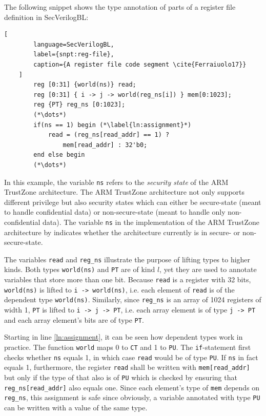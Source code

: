 \begin{example}
    The following snippet shows the type annotation of parts of a register file definition in SecVerilogBL:
    \begin{lstlisting}[
        language=SecVerilogBL,
        label={snpt:reg-file},
        caption={A register file code segment \cite{Ferraiuolo17}}
    ]
        reg [0:31] {world(ns)} read;
        reg [0:31] { i -> j -> world(reg_ns[i]) } mem[0:1023];
        reg {PT} reg_ns [0:1023];
        (*\dots*)
        if(ns == 1) begin (*\label{ln:assignment}*)
            read = (reg_ns[read_addr] == 1) ?
                mem[read_addr] : 32'b0;
        end else begin
        (*\dots*)
    \end{lstlisting}

    In this example, the variable \lstinline{ns} refers to the \textit{security state} of the ARM TrustZone architecture.
    The ARM TrustZone architecture not only supports different privilege but also security states which can either be secure-state (meant to handle confidential data) or non-secure-state (meant to handle only non-confidential data).
    The variable \lstinline{ns} in the implementation of the ARM TrustZone architecture by \citeauthor{Ferraiuolo17} indicates whether the architecture currently is in secure- or non-secure-state.

    The variables \lstinline{read} and \lstinline{reg_ns} illustrate the purpose of lifting types to higher kinds.
    Both types \lstinline{world(ns)} and \lstinline{PT} are of kind $ l $, yet they are used to annotate variables that store more than one bit.
    Because \lstinline{read} is a register with 32 bits, \lstinline{world(ns)} is lifted to \lstinline{i -> world(ns)}, i.e. each element of \lstinline{read} is of the dependent type \lstinline{world(ns)}.
    Similarly, since \lstinline{reg_ns} is an array of 1024 registers of width 1, \lstinline{PT} is lifted to \lstinline{i -> j -> PT}, i.e. each array element is of type \lstinline{j -> PT} and  each array element's bits are of type \lstinline{PT}.

    Starting in line \ref{ln:assignment}, it can be seen how dependent types work in practice.
    The function \lstinline{world} maps 0 to \lstinline{CT} and 1 to \lstinline{PU}.
    The \lstinline{if}-statement first checks whether \lstinline{ns} equals 1, in which case \lstinline{read} would be of type \lstinline{PU}.
    If \lstinline{ns} in fact equals 1, furthermore, the register \lstinline{read} shall be written with \lstinline{mem[read_addr]} but only if the type of that also is of \lstinline{PU} which is checked by ensuring that \lstinline{reg_ns[read_addr]} also equals one.
    Since each element's type of \lstinline{mem} depends on \lstinline{reg_ns}, this assignment is safe since obviously, a variable annotated with type \lstinline{PU} can be written with a value of the same type.


\end{example}
